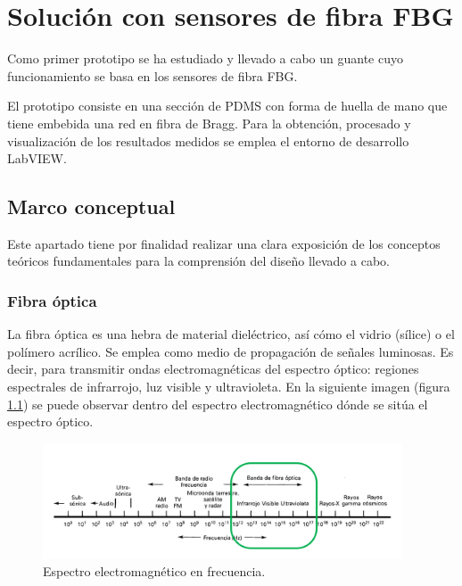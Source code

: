 \chapter{Solución con sensores de fibra FBG\label{sec:FBG}}

\label{sec:FBG3}

 Como primer prototipo se ha estudiado y llevado a cabo un guante cuyo funcionamiento se basa en los sensores de fibra FBG. 
 
 El prototipo consiste en una sección de PDMS con forma de huella de mano que tiene embebida una red en fibra de Bragg. Para la obtención, procesado y visualización de los resultados medidos se emplea el entorno de desarrollo LabVIEW.



\section{Marco conceptual}
\label{sec:marco3}

Este apartado tiene por finalidad realizar una clara exposición de los conceptos teóricos fundamentales para la comprensión del diseño llevado a cabo. 


\subsection{Fibra óptica}
\label{sec:fibra3}

	La fibra óptica es una hebra de material dieléctrico, así cómo el vidrio (sílice) o el polímero acrílico. 
	Se emplea como medio de propagación de señales luminosas. Es decir, para transmitir ondas electromagnéticas del espectro óptico: regiones espectrales de infrarrojo, luz visible y ultravioleta. En la siguiente imagen (figura \ref{fig:espectroOptico}) se puede observar dentro del espectro electromagnético dónde se sitúa el espectro óptico.	 
	
	\begin{figure}[H]
		\centering
		\includegraphics[width=0.95\textwidth]{./img/espectrooptico}
		\caption{Espectro electromagnético en frecuencia.}
		\label{fig:espectroOptico}
	\end{figure}
	
